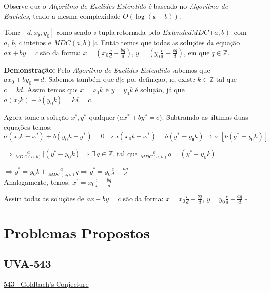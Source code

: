 Observe que o \textit{Algoritmo de Euclides Extendido} é baseado no \textit{Algoritmo de Euclides}, tendo a mesma complexidade $O(\log(a+b))$.
\\


\begin{corollary}\label{mdc_extended_solutions}
Tome $[d,x_0,y_0]$ como sendo a tupla retornada pelo $ExtendedMDC(a,b)$, com $a$, $b$, $c$ inteiros e $MDC(a,b)|c$.
Então temos que todas as soluções da equação $ax+by=c$ são da forma: $x=(x_0\frac{c}{d} + \frac{bq}{d})$, $y=(y_0\frac{c}{d} - \frac{aq}{d})$, em que $q\in\mathbb{Z}$.
\end{corollary}
\textbf{Demonstração:}
Pelo \textit{Algoritmo de Euclides Extendido} sabemos que $ax_0 + by_0=d$. Sabemos também que $d|c$ por definição, ie, existe $k\in\mathbb{Z}$ tal que $c=kd$.
Assim temos que $x=x_0k$ e $y=y_0k$ é solução, já que $a(x_0k)+b(y_0k) = kd = c$. 

Agora tome a solução $x^*,y^*$ qualquer ($ax^*+by^*=c$). Subtraindo as últimas duas equações temos:
\\

$a(x_0k-x^*) + b(y_0k-y^*) = 0 \Rightarrow a(x_0k-x^*) = b(y^* - y_0k) \Rightarrow a|[b(y^* - y_0k)]$

$\Rightarrow \frac{a}{MDC(a,b)}|(y^* - y_0k) \Rightarrow \exists! q\in\mathbb{Z}$, tal que $\frac{a}{MDC(a,b)}q = (y^* - y_0k)$

$\Rightarrow y^* = y_0k + \frac{a}{MDC(a,b)}q \Rightarrow y^* = y_0\frac{c}{d} - \frac{aq}{d}$
\\

Analogamente, temos: $x^* = x_0\frac{c}{d} + \frac{bq}{d}$

Assim todas as soluções de $ax+by=c$ são da forma:
$x = x_0\frac{c}{d} + \frac{bq}{d}$, $y = y_0\frac{c}{d} - \frac{aq}{d}$ $\square$
\\



\section{Problemas Propostos}



\subsection{UVA-543}
\href{https://uva.onlinejudge.org/index.php?option=onlinejudge&page=show_problem&problem=484}{543 - Goldbach's Conjecture}\\

